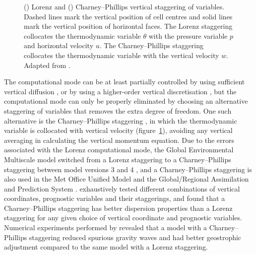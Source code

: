 \begin{figure}
	\centering
	\begin{subfigure}{\textwidth}
		\centering
		\label{fig:cp:vertical-staggering:lorenz}
		\label{fig:cp:vertical-staggering:cp}
		
	\end{subfigure}
	\caption{
	()
	Lorenz and
	() Charney–Phillips vertical staggering of variables.
	Dashed lines mark the vertical position of cell centres and solid lines mark the vertical position of horizontal faces.
	The Lorenz staggering collocates the thermodynamic variable $\theta$ with the pressure variable $p$ and horizontal velocity $u$.
	The Charney--Phillips staggering collocates the thermodynamic variable with the vertical velocity $w$.
	Adapted from \citet{holdaway2013a}.}
	\label{fig:cp:vertical-staggering}
\end{figure}

The computational mode can be at least partially controlled by using sufficient vertical diffusion \citep{chang1992,zadra2004}, or by using a higher-order vertical discretisation \citep{untch-hortal2004,guerra-ullrich2016,yi-park2017}, but the computational mode can only be properly eliminated by choosing an alternative staggering of variables that removes the extra degree of freedom.
One such alternative is the Charney--Phillips staggering \citep{charney-phillips1953}, in which the thermodynamic variable is collocated with vertical velocity (figure~\ref{fig:cp:vertical-staggering:cp}), avoiding any vertical averaging in calculating the vertical momentum equation.
Due to the errors associated with the Lorenz computational mode, the Global Environmental Multiscale model switched from a Lorenz staggering to a Charney--Phillips staggering between model versions 3 and 4 \citep{girard2014}, and a Charney--Phillips staggering is also used in the Met Office Unified Model \citep{davies2005} and the Global/Regional Assimilation and Prediction System \citep{yang2007}.
\citet{thuburn-woolings2005} exhaustively tested different combinations of vertical coordinates, prognostic variables and their staggerings, and found that a Charney--Phillips staggering has better dispersion properties than a Lorenz staggering for any given choice of vertical coordinate and prognostic variables.
Numerical experiments performed by \citet{cullen1997} revealed that a model with a Charney--Phillips staggering reduced spurious gravity waves and had better geostrophic adjustment compared to the same model with a Lorenz staggering.

